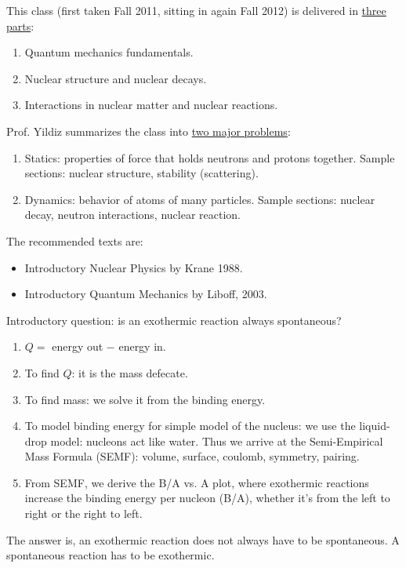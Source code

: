 \documentclass{school-22.101-notes}
\date{September 7, 2011}
\begin{document}
\maketitle


This class (first taken Fall 2011, sitting in again Fall 2012) is delivered in \uline{three parts}:
\begin{enumerate}
\item Quantum mechanics fundamentals. 
\item Nuclear structure and nuclear decays.
\item Interactions in nuclear matter and nuclear reactions.
\end{enumerate}

Prof. Yildiz summarizes the class into \uline{two major problems}:
\begin{enumerate}
\item Statics: properties of force that holds neutrons and protons together. Sample sections: nuclear structure, stability (scattering). 

\item Dynamics: behavior of atoms of many particles. Sample sections: nuclear decay, neutron interactions, nuclear reaction. 
\end{enumerate}



The recommended texts are: 
\begin{itemize}
\item Introductory Nuclear Physics by Krane 1988.
\item Introductory Quantum Mechanics by Liboff, 2003.
\end{itemize}

\vspace{0.5cm}
Introductory question: is an exothermic reaction always spontaneous? 
\begin{enumerate}
\item $Q = $ energy out $-$ energy in. 
\item To find $Q$: it is the mass defecate. 
\item To find mass: we solve it from the binding energy. 
\item To model binding energy for simple model of the nucleus: we use the liquid-drop model: nucleons act like water. Thus we arrive at the Semi-Empirical Mass Formula (SEMF): volume, surface, coulomb, symmetry, pairing.  
\item From SEMF, we derive the B/A vs. A plot, where exothermic reactions increase the binding energy per nucleon (B/A), whether it's from the left to right or the right to left.
\end{enumerate}
The answer is, an exothermic reaction does not always have to be spontaneous. A spontaneous reaction has to be exothermic. 
\end{document}
